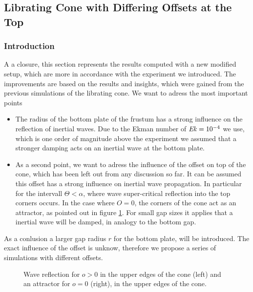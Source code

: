\clearpage

\subsection{Librating Cone with Differing Offsets at the Top}
\subsubsection{Introduction}

A a closure, this section represents the results computed with a new modified setup, which are more in accordance
with the experiment we introduced.
The improvements are based on the results and insights, which were gained from the previous simulations of the librating cone.
We want to adress the  most important points

\begin{itemize}
    \item The radius of the bottom plate of the frustum has a strong influence on
          the reflection of inertial waves.
          Due to the Ekman number of $\mbox{\textit{Ek}}=10^{-4}$ we use, which is one order of magnitude
          above the experiment we assumed that a stronger damping acts on an inertial wave
          at the bottom plate.

    \item As a second point, we want to adress the influence of the offset on top of the cone,
          which has been left out from any discussion so far.
          It can be assumed this offset has a strong influence
          on inertial wave propagation.
          In particular for the intervall $\Theta<\alpha$, where wave super-critical reflection into the top corners occurs.
          In the case where $O=0$, the corners of the cone act as an attractor, as pointed out in figure \ref{cone:img_finalattractor}.
          For small gap sizes it applies that a inertial wave will be damped, in analogy to the bottom gap.
\end{itemize}

As a conlusion a larger gap radius $r$ for the bottom plate, will be introduced.
The exact influence of the offset is unknow, therefore we propose a series of simulations with different offsets.

\begin{figure}[!bp]
      \centering
      \caption{
          Wave reflection for $o>0$ in the upper edges of the cone (left) and
          an attractor for $o=0$ (right), in the upper edges of the cone.
      \label{cone:img_finalattractor}
      }
\end{figure}

